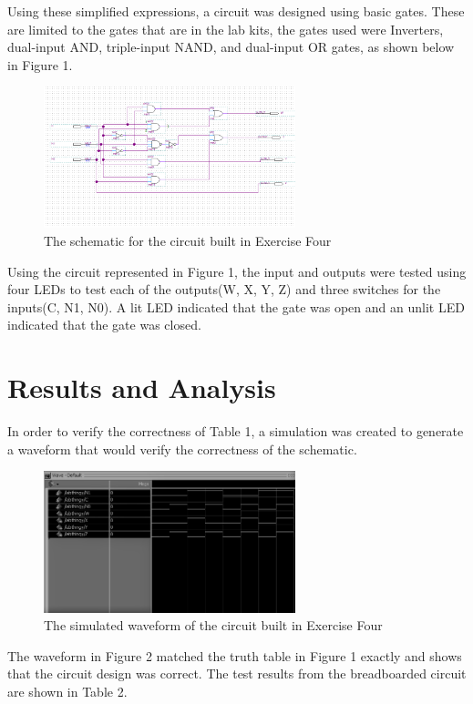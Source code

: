 \documentclass[CMPE]{KGCOEReport}
\begin{document}
Using these simplified expressions, a circuit was designed using basic gates. These are limited to the gates that are in the lab kits, the gates used were Inverters, dual-input AND, triple-input NAND, and dual-input OR gates, as shown below in Figure 1.

\begin{figure}[H]
	\centering
	\includegraphics[width=0.65\textwidth]{QuartusL4}
	\caption{The schematic for the circuit built in Exercise Four}
	\label{fig: Figure 1}
\end{figure}

Using the circuit represented in Figure 1, the input and outputs were tested using four LEDs to test each of the outputs(W, X, Y, Z) and three switches for the inputs(C, N1, N0). A lit LED indicated that the gate was open and an unlit LED indicated that the gate was closed.

\section*{Results and Analysis}
In order to verify the correctness of Table 1, a simulation was created to generate a waveform that would verify the correctness of the schematic.

\begin{figure}[H]
	\centering
	\includegraphics[width=0.65\textwidth]{ModelsimL4}
	\caption{The simulated waveform of the circuit built in Exercise Four}
	\label{fig: Figure 2}
\end{figure}

The waveform in Figure 2 matched the truth table in Figure 1 exactly and shows that the circuit design was correct. The test results from the breadboarded circuit are shown in Table 2.
\end{document}
